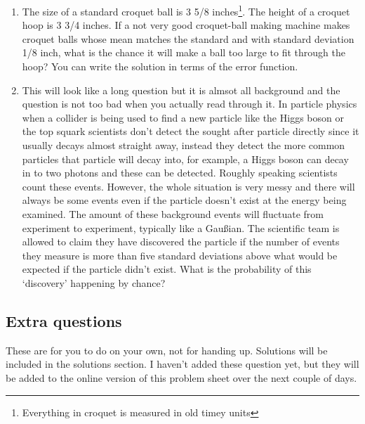 \documentclass[11pt,a4paper]{scrartcl}
\begin{document}
\begin{enumerate}

\item The size of a standard croquet ball is 3 5/8
  inches\footnote{Everything in croquet is measured in old timey
    units}. The height of a croquet hoop is 3 3/4 inches. If a not
  very good croquet-ball making machine makes croquet balls whose mean
  matches the standard and with standard deviation 1/8 inch, what is
  the chance it will make a ball too large to fit through the hoop?
  You can write the solution in terms of the error function.



\item This will look like a long question but it is almsot all
  background and the question is not too bad when you actually read
  through it. In particle physics when a collider is being used to
  find a new particle like the Higgs boson or the top squark
  scientists don't detect the sought after particle directly since it
  usually decays almost straight away, instead they detect the more
  common particles that particle will decay into, for example, a Higgs
  boson can decay in to two photons and these can be detected. Roughly
  speaking scientists count these events. However, the whole situation
  is very messy and there will always be some events even if the
  particle doesn't exist at the energy being examined. The amount of
  these background events will fluctuate from experiment to
  experiment, typically like a Gau\ss{}ian. The scientific team is
  allowed to claim they have discovered the particle if the number of
  events they measure is more than five standard deviations above
  what would be expected if the particle didn't exist. What is the
  probability of this \lq{}discovery\rq{} happening by chance?



\end{enumerate}

\subsection*{Extra questions}

These are for you to do on your own, not for handing up. Solutions will be included in the solutions section. I haven't added these question yet, but they will be added to the online version of this problem sheet over the next couple of days.
\end{document}
